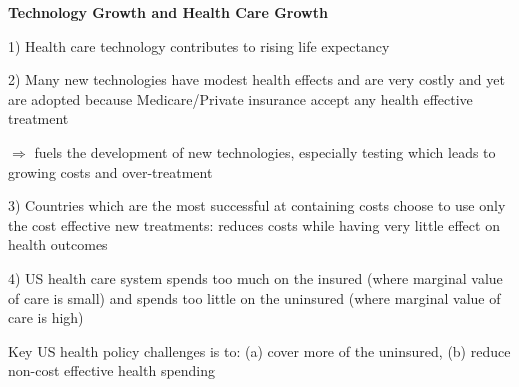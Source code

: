 \documentclass[landscape]{slides}
\begin{document}
\begin{slide}

\end{slide}

\begin{slide}
\begin{center}
{\bf Technology Growth and Health Care Growth}
\end{center}

1) Health care technology contributes to rising life expectancy %

2) Many new technologies have modest health effects and are very
costly and yet are adopted because Medicare/Private insurance accept any
health effective treatment %

\small
$\Rightarrow$ fuels the development of new technologies, especially testing which
leads to growing costs and over-treatment

\normalsize
3) Countries which are the most successful at containing costs choose to use
only the cost effective new treatments: reduces costs while having very little effect
on health outcomes

4) US health care system spends too much on the insured
(where marginal value of care is small) and spends too little on the uninsured (where
marginal value of care is high)

Key US health policy challenges is to: (a) cover more of the uninsured, (b) reduce non-cost effective
health spending %
\end{slide}


\begin{slide}

\end{slide}

%
%
%
%
%
%
\end{document}
